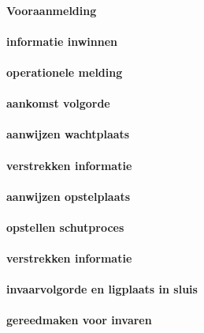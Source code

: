 \paragraph{Vooraanmelding}


\paragraph{informatie inwinnen}


\paragraph{operationele melding}


\paragraph{aankomst volgorde}

\paragraph{aanwijzen wachtplaats}


\paragraph{verstrekken informatie}


\paragraph{aanwijzen opstelplaats}

\paragraph{opstellen schutproces}


\paragraph{verstrekken informatie}


\paragraph{invaarvolgorde en ligplaats in sluis}

\paragraph{gereedmaken voor invaren}



